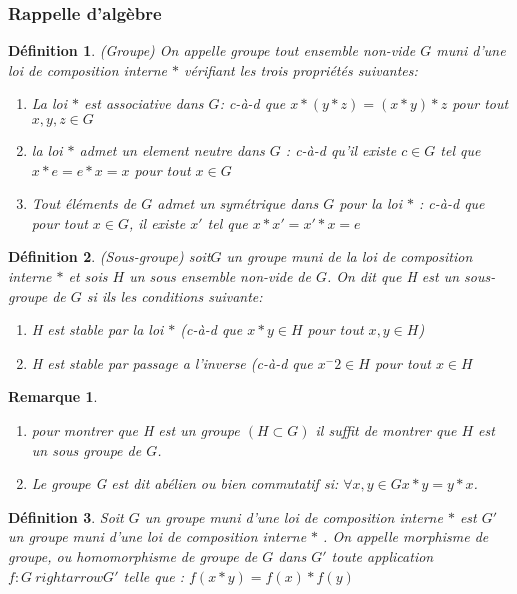 \documentclass[12pt]{report}
\newtheorem{madef}{Définition}[section]
\newtheorem{rmq}{Remarque}[section]
\begin{document}
\subsubsection{Rappelle d'algèbre}
\begin{madef}(Groupe)
On appelle groupe tout ensemble non-vide $G$ muni d'une loi de composition interne $*$ vérifiant les trois propriétés suivantes:
\begin{enumerate}
\item[1] La loi $*$ est associative dans $G$:
c-à-d que $x*(y*z)=(x*y)*z$ pour tout $x,y,z\in G$ 
\item[2]  la loi $*$ admet un element neutre dans $G$ :
  c-à-d qu'il existe $c\in G$ tel que $x*e=e*x=x$ pour tout $x\in G$
\item[3] Tout éléments de $G$ admet un symétrique dans $G$ pour la loi $*$ :
c-à-d que pour tout $x\in G$, il existe $x'$ tel que $x*x'=x'*x=e$    
\end{enumerate}
\end{madef}
\begin{madef}(Sous-groupe)
soit$G$ un groupe muni de la loi de composition interne $*$ et sois $H$ un sous ensemble non-vide de $G$. On dit que H est un sous-groupe de $G$ si ils  les conditions suivante:
\begin{enumerate}
\item[(i)] H est stable par la loi $*$ (c-à-d que $x*y \in H$ pour tout $x,y\in H$)
\item[(ii)] H est stable par passage a l'inverse (c-à-d que $x^-2 \in H$ pour tout $ x\in H$ %
\end{enumerate}
\end{madef}
\begin{rmq} 
\begin{enumerate}
\item[1.] pour montrer que H est un groupe $(H \subset G )$ il suffit de montrer que $H$ est un sous groupe de $G$.
\item[2.] Le groupe G est dit abélien ou bien commutatif si: $\forall x,y\in G x*y=y*x$.
\end{enumerate}
\end{rmq}
\begin{madef}
Soit $G$ un groupe muni d'une loi de composition interne $*$ est $G'$ un groupe muni d'une loi de composition interne $*$ . On appelle morphisme de groupe, ou homomorphisme de groupe de $G$ dans $G'$ toute application $f: G\
rightarrow G'$ telle que : $f(x*y)=f(x)*f(y)$
\end{madef}
\end{document}
